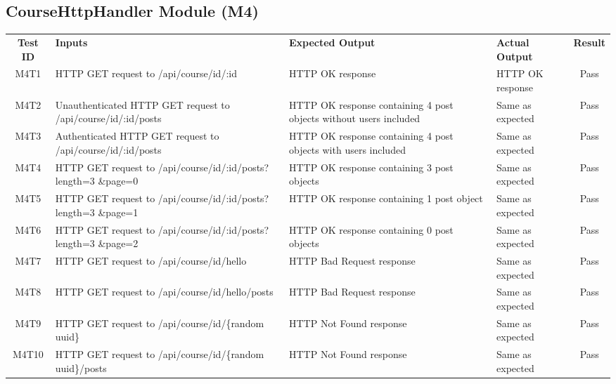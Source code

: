 \documentclass[fullpage]{article}
\begin{document}
\subsection{CourseHttpHandler Module (M4)}
\begin{table}[H]
\flushleft
\begin{tabular}{|c|p{4.5cm}|p{3.6cm}|p{3.6cm}|c|}
\hline
 \rowcolor{lightgray} 
\textbf{Test ID} &\textbf{Inputs} &\textbf{Expected Output} &\textbf{Actual Output} &\textbf{Result}\\
M4T1 & HTTP GET request to /api/course/id/:id & HTTP OK response & HTTP OK response & Pass \\
\hline
M4T2 & Unauthenticated HTTP GET request to /api/course/id/:id/posts & HTTP OK response containing 4 post objects without users included & Same as expected & Pass\\
\hline
M4T3 & Authenticated HTTP GET request to /api/course/id/:id/posts & HTTP OK response containing 4 post objects with users included & Same as expected & Pass\\
\hline
M4T4 & HTTP GET request to /api/course/id/:id/posts?length=3 \&page=0 & HTTP OK response containing 3 post objects & Same as expected & Pass\\
\hline
M4T5 & HTTP GET request to /api/course/id/:id/posts?length=3 \&page=1 & HTTP OK response containing 1 post object & Same as expected & Pass\\
\hline
M4T6 & HTTP GET request to /api/course/id/:id/posts?length=3 \&page=2 & HTTP OK response containing 0 post objects & Same as expected & Pass\\
\hline
M4T7 & HTTP GET request to /api/course/id/hello & HTTP Bad Request response  & Same as expected & Pass\\
\hline
M4T8 & HTTP GET request to /api/course/id/hello/posts & HTTP Bad Request response  & Same as expected& Pass\\
\hline
M4T9 & HTTP GET request to /api/course/id/\{random uuid\} & HTTP Not Found response  & Same as expected & Pass\\
\hline
M4T10 & HTTP GET request to /api/course/id/\{random uuid\}/posts & HTTP Not Found response  & Same as expected & Pass\\
\hline


\end{tabular}
\end{table}
\end{document}

